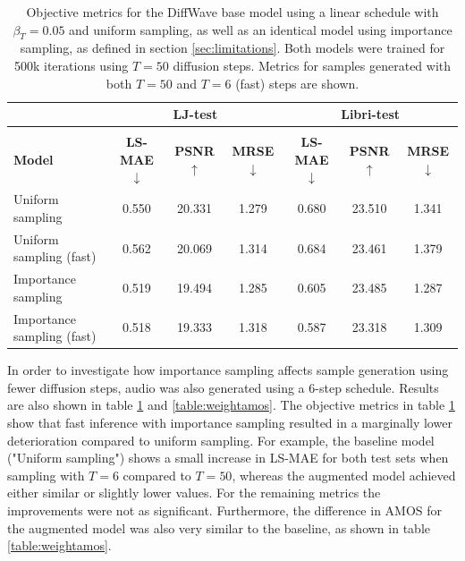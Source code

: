 \documentclass{report}
\begin{document}
\begin{table}[H]
\centering
\def\arraystretch{1.3}
\begin{tabular}{l | c c c | c c c }
\hline
 & \multicolumn{3}{c|}{\textbf{LJ-test}} & \multicolumn{3}{c}{\textbf{Libri-test}} \\
\hline\hline
\vspace{-0.5cm} \\
\textbf{Model} & \textbf{LS-MAE} $\downarrow$ & \textbf{PSNR} $\uparrow$ & \textbf{MRSE} $\downarrow$ & \textbf{LS-MAE} $\downarrow$ & \textbf{PSNR} $\uparrow$ & \textbf{MRSE} $\downarrow$ \\ [0.5ex]
\hline
Uniform sampling & 0.550 & 20.331 & 1.279 & 0.680 & 23.510 & 1.341 \\
\hline
Uniform sampling (fast) & 0.562 & 20.069 & 1.314 & 0.684 & 23.461 & 1.379 \\
\hline
Importance sampling & 0.519 & 19.494 & 1.285 & 0.605 & 23.485 & 1.287 \\
\hline
Importance sampling (fast) & 0.518 &  19.333 & 1.318 & 0.587 & 23.318 & 1.309 \\
\hline\hline
\end{tabular}
\caption{\onehalfspacing Objective metrics for the DiffWave base model using a linear schedule with $\beta_T=0.05$ and uniform sampling, as well as an identical model using importance sampling, as defined in section \ref{sec:limitations}. Both models were trained for 500k iterations using $T=50$ diffusion steps. Metrics for samples generated with both $T=50$ and $T=6$ (fast) steps are shown.}
\label{table:weightstats}
\end{table}

In order to investigate how importance sampling affects sample generation using fewer diffusion steps, audio was also generated using a 6-step schedule. Results are also shown in table \ref{table:weightstats} and \ref{table:weightamos}. The objective metrics in table \ref{table:weightstats} show that fast inference with importance sampling resulted in a marginally lower deterioration compared to uniform sampling. For example, the baseline model ("Uniform sampling") shows a small increase in LS-MAE for both test sets when sampling with $T=6$ compared to $T=50$, whereas the augmented model achieved either similar or slightly lower values. For the remaining metrics the improvements were not as significant. Furthermore, the difference in AMOS for the augmented model was also very similar to the baseline, as shown in table \ref{table:weightamos}.
\end{document}
